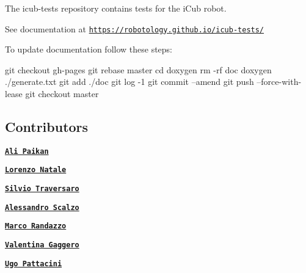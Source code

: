 The {\ttfamily icub-\/tests} repository contains tests for the i\+Cub robot.

See documentation at \href{https://robotology.github.io/icub-tests/}{\tt https\+://robotology.\+github.\+io/icub-\/tests/}

To update documentation follow these steps\+:


\begin{DoxyCode}
git checkout gh-pages
git rebase master
cd doxygen
rm -rf doc
doxygen ./generate.txt
git add ./doc
git log -1
git commit --amend
git push --force-with-lease
git checkout master
\end{DoxyCode}


\subsection*{Contributors}


\begin{DoxyItemize}
\item \href{https://github.com/apaikan}{\tt {\bfseries Ali Paikan}}
\item \href{https://github.com/lornat75}{\tt {\bfseries Lorenzo Natale}}
\item \href{https://github.com/traversaro}{\tt {\bfseries Silvio Traversaro}}
\item \href{https://github.com/ale-git}{\tt {\bfseries Alessandro Scalzo}}
\item \href{https://github.com/randaz81}{\tt {\bfseries Marco Randazzo}}
\item \href{https://github.com/valegagge}{\tt {\bfseries Valentina Gaggero}}
\item \href{https://github.com/pattacini}{\tt {\bfseries Ugo Pattacini}} 
\end{DoxyItemize}